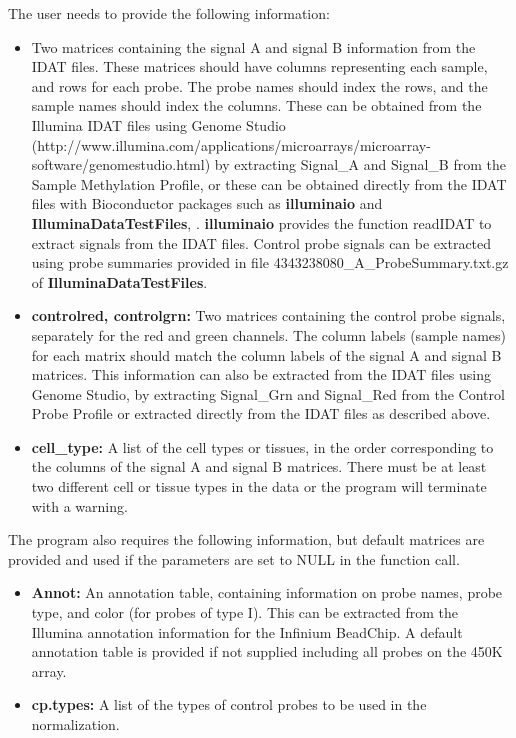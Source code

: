 \documentclass{article}
\begin{document}
The user needs to provide the following information:
\begin{itemize}
  \item {} Two matrices containing the signal A and signal B information from the IDAT files.
  These matrices should have columns representing each sample, and rows for each probe.  
  The probe names should index the rows, and the sample names should index the columns.
  These can be obtained from the Illumina IDAT files using Genome Studio  (http://www.illumina.com/applications/microarrays/microarray-software/genomestudio.html) by extracting Signal_A and Signal_B from the Sample Methylation Profile, or these can be obtained directly from the IDAT files with Bioconductor packages such as \textbf{illuminaio} and \textbf{IlluminaDataTestFiles}, \cite{Smith2013}. \textbf{illuminaio} provides the function readIDAT to extract signals from the IDAT files. Control probe signals can be extracted using probe summaries provided in file 4343238080_A_ProbeSummary.txt.gz of \textbf{IlluminaDataTestFiles}.
   \item \textbf{controlred, controlgrn:}  Two matrices containing the control probe signals, separately for the red and green channels. 
  The column labels (sample names) for each matrix should match the column labels of the signal A and signal B matrices.
  This information can also be extracted from the IDAT files using Genome Studio, by extracting Signal_Grn and Signal_Red from the Control Probe Profile or extracted directly from the IDAT files as described above.
   \item \textbf{cell\_type:} A list of the cell types or tissues, in the order corresponding to the columns of the signal A and signal B matrices.  
  There must be at least two different cell or tissue types in the data or the program will terminate with a warning.
\end{itemize}

The program also requires the following information, but default matrices are provided and used if the parameters are set to NULL in the function call.

\begin{itemize}
\item \textbf{Annot:} An annotation table, containing information on probe names, probe type, and color (for probes of type I).  
This can be extracted from the Illumina annotation information for the Infinium BeadChip.
A default annotation table is provided if not supplied including all probes on the 450K array.
\item  \textbf{cp.types:}  A list of the types of control probes to be used in the normalization.
\end{itemize}
\end{document}
